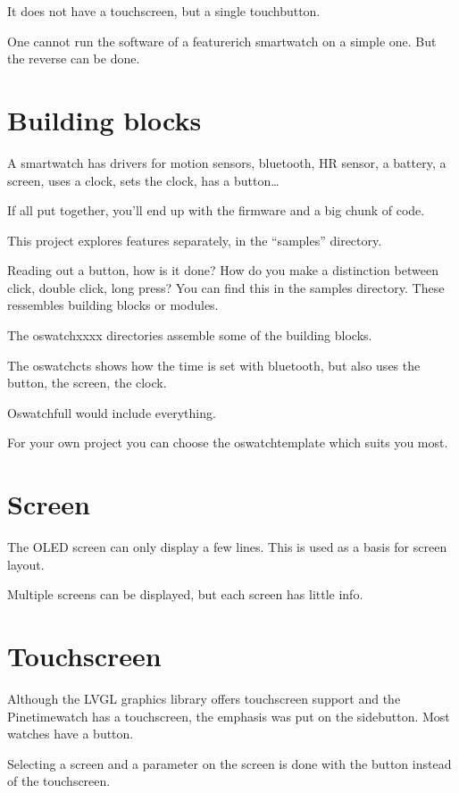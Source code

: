 \documentclass[letterpaper,10pt,english]{sphinxmanual}
\begin{document}
It does not have a touchscreen, but a single touchbutton.

One cannot run the software of a feature\sphinxhyphen{}rich smartwatch on a simple one.
But the reverse can be done.


\section{Building blocks}
\label{\detokenize{idea:building-blocks}}
A smartwatch has drivers for motion sensors, bluetooth, HR sensor, a battery, a screen, uses a clock, sets the clock, has a button…

If all put together, you’ll end up with the firmware and a big chunk of code.

This project explores features separately, in the “samples” directory.

Reading out a button, how is it done? How do you make a distinction between click, double click, long press? You can find this in the samples directory. These ressembles building blocks or modules.

The oswatch\sphinxhyphen{}xxxx directories assemble some of the building blocks.

The oswatch\sphinxhyphen{}cts shows how the time is set with bluetooth, but also uses the button, the screen, the clock.

Oswatch\sphinxhyphen{}full would include everything.

For your own project you can choose the oswatch\sphinxhyphen{}template which suits you most.


\section{Screen}
\label{\detokenize{idea:screen}}
The OLED screen can only display a few lines.
This is used as a basis for screen layout.

Multiple screens can be displayed, but each screen has little info.


\section{Touchscreen}
\label{\detokenize{idea:touchscreen}}
Although the LVGL graphics library offers touchscreen support and the Pinetimewatch has a touchscreen, the emphasis was put on the sidebutton. Most watches have a button.

Selecting a screen and a parameter on the screen is done with the button instead of the touchscreen.
\end{document}
